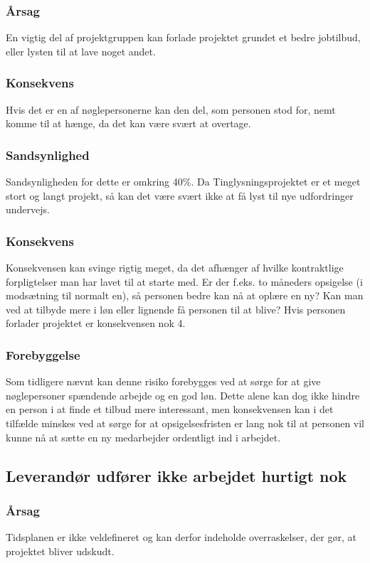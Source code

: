 \documentclass[10pt,a4paper,danish]{article}
\begin{document}
\subsubsection{Årsag}
En vigtig del af projektgruppen kan forlade projektet grundet et bedre jobtilbud, eller lysten til at lave noget andet.

\subsubsection{Konsekvens}
Hvis det er en af nøglepersonerne kan den del, som personen stod for, nemt komme til at hænge, da det kan være svært at overtage. 

\subsubsection{Sandsynlighed}
Sandsynligheden for dette er omkring 40\%. Da Tinglysningsprojektet er et meget stort og langt projekt, så kan det være svært ikke at få lyst til nye udfordringer undervejs.

\subsubsection{Konsekvens}
Konsekvensen kan svinge rigtig meget, da det afhænger af hvilke kontraktlige forpligtelser man har lavet til at starte med. Er der f.eks. to måneders opsigelse (i modsætning til normalt en), så personen bedre kan nå at oplære en ny? Kan man ved at tilbyde mere i løn eller lignende få personen til at blive? Hvis personen forlader projektet er konsekvensen nok 4.

\subsubsection{Forebyggelse}
Som tidligere nævnt kan denne risiko forebygges ved at sørge for at give nøglepersoner spændende arbejde og en god løn. Dette alene kan dog ikke hindre en person i at finde et tilbud mere interessant, men konsekvensen kan i det tilfælde minskes ved at sørge for at opsigelsesfristen er lang nok til at personen vil kunne nå at sætte en ny medarbejder ordentligt ind i arbejdet.



\subsection{Leverandør udfører ikke arbejdet hurtigt nok}
\subsubsection{Årsag}
Tidsplanen er ikke veldefineret og kan derfor indeholde overraskelser, der gør, at projektet bliver udskudt.
\end{document}
